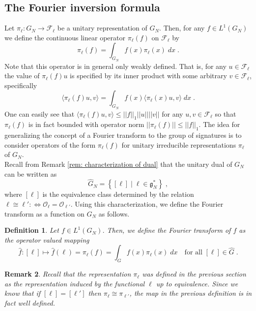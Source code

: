 \documentclass[pdflatex,sn-mathphys-num]{sn-jnl}
\theoremstyle{thmstyletwo}
\newtheorem{definition}{Definition}[section]
\theoremstyle{thmstyleone}
\newtheorem{proposition}[definition]{Proposition}
\theoremstyle{thmstyletwo}
\newtheorem{remark}[definition]{Remark}
\newcommand{\fancyg}{\mathfrak{g}}
\begin{document}
	\subsection{The Fourier inversion formula}
	
	Let $\pi_\ell: G_N \to \mathcal{F}_{\ell}$ be a unitary representation of $G_N$. Then, for any $f \in L^1(G_N)$ we define the continuous linear operator $\pi_\ell(f)$ on $\mathcal{F}_{\ell}$ by
	\[\pi_\ell(f) = \int_{G_N} f(x) \pi_\ell(x) \;dx \;.\]
	Note that this operator is in general only weakly defined. That is, for any $u \in \mathcal{F}_{\ell}$ the value of $\pi_\ell(f)u$ is specified by its inner product with some arbitrary $v \in \mathcal{F}_{\ell}$, specifically
	\[\langle \pi_\ell(f)u,v\rangle = \int_{G_N} f(x)\langle \pi_\ell(x)u,v\rangle \;dx\;.\]
	One can easily see that $\langle \pi_\ell(f)u,v\rangle \leq ||f||_1||u||||v||$ for any $u,v \in \mathcal{F}_{\ell}$ so that $\pi_\ell(f)$ is in fact bounded with operator norm $||\pi_\ell(f)|| \leq ||f||_1$. The idea for generalizing the concept of a Fourier transform to the group of signatures is to consider operators of the form $\pi_\ell(f)$ for unitary irreducible representations $\pi_\ell$ of $G_N$.\\
	Recall from Remark \ref{rem: characterization of dual} that the unitary dual of $G_N$ can be written as
	\[\hat{G}_N = \left\{[\ell] \;|\; \ell \in \fancyg_N^*\right\} \;,\]
	where $[\ell]$ is the equivalence class determined by the relation $\ell \cong \ell' :\iff \mathcal{O}_{\ell} = \mathcal{O}_{\ell'}$. Using this characterization, we define the Fourier transform as a function on ${G}_N$ as follows.
	\begin{definition}\label{def: fourier trafo}
		Let $f \in L^1(G_N)$. Then, we define the Fourier transform of $f$ as the operator valued mapping
		\[\hat{f}: [\ell] \mapsto \hat{f}(\ell) = \pi_{\ell}(f) = \int_G f(x) \pi_{\ell}(x) \;dx \quad \text{for all } [\ell] \in \hat{G} \;.\]
	\end{definition}
	\begin{remark}
		Recall that the representation $\pi_{\ell}$ was defined in the previous section as the representation induced by the functional $\ell$ \textit{up to equivalence}. Since we know that if $[\ell] = [\ell']$ then $\pi_{\ell} \cong \pi_{\ell'}$, the map in the previous definition is in fact well defined.
	\end{remark}
\end{document}
